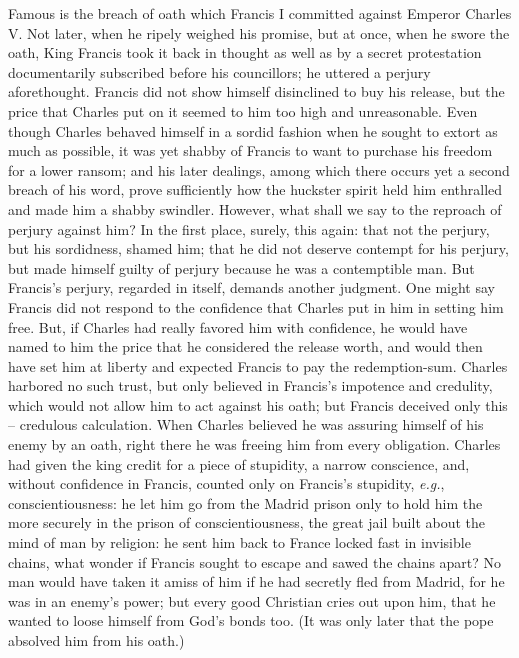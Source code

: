 Famous is the breach of oath which Francis I committed against Emperor Charles 
V. Not later, when he ripely weighed his promise, but at once, when he swore 
the oath, King Francis took it back in thought as well as by a secret 
protestation documentarily subscribed before his councillors; he uttered a 
perjury aforethought. Francis did not show himself disinclined to buy his 
release, but the price that Charles put on it seemed to him too high and 
unreasonable. Even though Charles behaved himself in a sordid fashion when he 
sought to extort as much as possible, it was yet shabby of Francis to want to 
purchase his freedom for a lower ransom; and his later dealings, among which 
there occurs yet a second breach of his word, prove sufficiently how the 
huckster spirit held him enthralled and made him a shabby swindler. However, 
what shall we say to the reproach of perjury against him? In the first place, 
surely, this again: that not the perjury, but his sordidness, shamed him; that 
he did not deserve contempt for his perjury, but made himself guilty of 
perjury because he was a contemptible man. But Francis's perjury, regarded in 
itself, demands another judgment. One might say Francis did not respond to the 
confidence that Charles put in him in setting him free. But, if Charles had 
really favored him with confidence, he would have named to him the price that 
he considered the release worth, and would then have set him at liberty and 
expected Francis to pay the redemption-sum. Charles harbored no such trust, 
but only believed in Francis's impotence and credulity, which would not allow 
him to act against his oath; but Francis deceived only this -- credulous 
calculation. When Charles believed he was assuring himself of his enemy by an 
oath, right there he was freeing him from every obligation. Charles had given 
the king credit for a piece of stupidity, a narrow conscience, and, without 
confidence in Francis, counted only on Francis's stupidity, \textit{e.g.}, 
conscientiousness: he let him go from the Madrid prison only to hold him the 
more securely in the prison of conscientiousness, the great jail built about 
the mind of man by religion: he sent him back to France locked fast in 
invisible chains, what wonder if Francis sought to escape and sawed the chains 
apart? No man would have taken it amiss of him if he had secretly fled from 
Madrid, for he was in an enemy's power; but every good Christian cries out 
upon him, that he wanted to loose himself from God's bonds too. (It was only 
later that the pope absolved him from his oath.)

